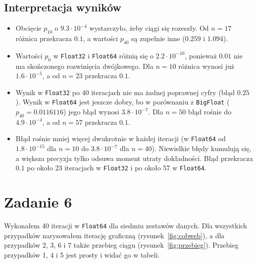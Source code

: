\documentclass[11pt,a4paper]{article}
\begin{document}
\subsection*{Interpretacja wyników}
\begin{itemize}
    \item Obcięcie $p_{10}$ o $9.3 \cdot 10^{-4}$ wystarczyło, żeby ciągi się rozeszły. Od $n = 17$ różnica przekracza $0.1$, a wartości $p_{40}$ są zupełnie inne ($0.259$ i $1.094$).
    \item Wartości $p_0$ w \texttt{Float32} i \texttt{Float64} różnią się o $2.2 \cdot 10^{-10}$, ponieważ $0.01$ nie ma skończonego rozwinięcia dwójkowego. Dla $n = 10$ różnica wynosi już $1.6 \cdot 10^{-5}$, a od $n = 23$ przekracza $0.1$.
    \item Wynik w \texttt{Float32} po 40 iteracjach nie ma żadnej poprawnej cyfry (błąd $0.25$). Wynik w \texttt{Float64} jest jeszcze dobry, bo w porównaniu z \texttt{BigFloat} ($p_{40} = 0.0116116$) jego błąd wynosi $3.8 \cdot 10^{-7}$. Dla $n = 50$ błąd rośnie do $4.9 \cdot 10^{-4}$, a od $n = 57$ przekracza $0.1$.
    \item Błąd rośnie mniej więcej dwukrotnie w każdej iteracji (w \texttt{Float64} od $1.8 \cdot 10^{-15}$ dla $n = 10$ do $3.8 \cdot 10^{-7}$ dla $n = 40$). Niewielkie błędy kumulują się, a większa precyzja tylko odsuwa moment utraty dokładności. Błąd przekracza $0.1$ po około 23 iteracjach w \texttt{Float32} i po około 57 w \texttt{Float64}.
\end{itemize}


\section{Zadanie 6}

Wykonałem 40 iteracji w \texttt{Float64} dla siedmiu zestawów danych. Dla wszystkich przypadków narysowałem iterację graficzną (rysunek~\ref{fig:cobweb}), a dla przypadków 2, 3, 6 i 7 także przebieg ciągu (rysunek~\ref{fig:przebieg}). Przebieg przypadków 1, 4 i 5 jest prosty i widać go w tabeli.
\end{document}
